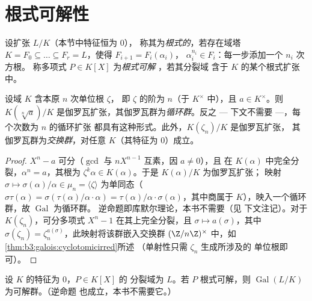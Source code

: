 \section{根式可解性}

\begin{definition}\label{def:b3:galois:radical}
设扩张 $L/K$（本节中特征恒为 $0$），
称其为\emph{根式的}，若存在域塔 $K = F_0 \subseteq \dots
\subseteq F_r = L$，使得 $F_{i+1} = F_i(\alpha_i)$，
$\alpha_i^{n_i} \in F_i$：每一步添加一个 $n_i$ 次方根。
称多项式 $P \in K[X]$ 为\emph{根式可解
}，若其分裂域
含于 $K$ 的某个根式扩张中。
\end{definition}

\begin{lemma}\label{lem:b3:galois:cyclicsteps}
设域 $K$ 含本原 $n$ 次单位根 $\zeta$，
即 $\zeta$ 的阶为 $n$（于 $K^\times$ 中），且 $a \in K^\times$。则
$K(\sqrt[n]a)/K$ 是伽罗瓦扩张，其伽罗瓦群为\emph{循环群}。反之
--- 下文不需要 ---，每个次数为 $n$ 的循环扩张
都具有这种形式。此外，$K(\zeta_n)/K$ 是伽罗瓦扩张，
其伽罗瓦群为\emph{交换群}，对任意 $K$（其特征为 $0$）成立。
\end{lemma}

\begin{proof}
$X^n - a$ 可分（$\gcd$ 与 $nX^{n-1}$ 互素，因 $a \neq 0$），且
在 $K(\alpha)$ 中完全分裂，$\alpha^n = a$，其根为
$\zeta^k\alpha \in K(\alpha)$。于是 $K(\alpha)/K$ 为伽罗瓦扩张；
映射 $\sigma \mapsto \sigma(\alpha)/\alpha \in \mu_n = \langle
\zeta\rangle$ 为单同态（$\sigma\tau(\alpha) =
\sigma(\tau(\alpha)/\alpha \cdot \alpha) =
\tau(\alpha)/\alpha\cdot\sigma(\alpha)$，其中商属于
$K$），映入一个循环群，故 $\operatorname{Gal}$ 为循环群。
逆命题即库默尔理论，本书不需要（见
下文注记）。对于 $K(\zeta_n)$，可分多项式 $X^n -
1$ 在其上完全分裂，且 $\sigma \mapsto a(\sigma)$，其中 $\sigma(\zeta_n) =
\zeta_n^{a(\sigma)}$，此映射将该群嵌入交换群
$(\Z/n\Z)^\times$ 中，如\cref{thm:b3:galois:cyclotomicirred}所述
（单射性只需 $\zeta_n$ 生成所涉及的
单位根即可）。
\end{proof}

\begin{theorem}[伽罗瓦]\label{thm:b3:galois:solvable}
设 $K$ 的特征为 $0$，$P \in K[X]$ 的
分裂域为 $L$。若 $P$ 根式可解，则
$\operatorname{Gal}(L/K)$ 为可解群。（逆命题
也成立，本书不需要它。）
\end{theorem}

